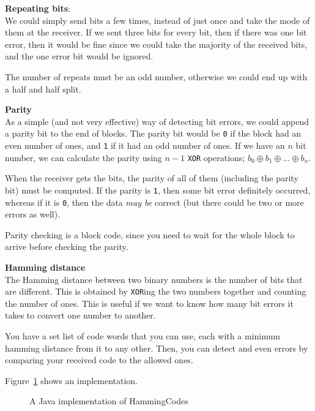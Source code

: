 \begin{description}
  \item \textbf{Repeating bits}:\\
    We could simply send bits a few times, instead of just once and take the 
    mode of them at the receiver. If we sent three bits for every bit, then
    if there was one bit error, then it would be fine since we could take the 
    majority of the received bits, and the one error bit would be ignored.

    The number of repeats must be an odd number, otherwise we could end up with 
    a half and half split.
  \item \textbf{Parity}\\
    As a simple (and not very effective) way of detecting bit errors, we could
    append a parity bit to the end of blocks. The parity bit would be \texttt{0}
    if the block had an even number of ones, and \texttt{1} if it had an odd
    number of ones. If we have an $n$ bit number, we can calculate the parity
    using $n - 1$ \texttt{XOR} operations; $b_0 \oplus b_1 \oplus \dots \oplus
    b_n$.

    When the receiver gets the bits, the parity of all of them (including the
    parity bit) must be computed. If the parity is \texttt{1}, then some bit
    error definitely occurred, whereas if it is \texttt{0}, then the data
    \textit{may be} correct (but there could be two or more errors as well).

    Parity checking is a block code, since you need to wait for the whole block
    to arrive before checking the parity.
  \item \textbf{Hamming distance}\\
    The Hamming distance between two binary numbers is the number of bits that
    are different. This is obtained by \texttt{XOR}ing the two numbers together
    and counting the number of ones. This is useful if we want to know how many
    bit errors it takes to convert one number to another.

    You have a set list of code words that you can use, each with a minimum
    hamming distance from it to any other. Then, you can detect and even errors
    by comparing your received code to the allowed ones.

    Figure~\ref{HammingCodes} shows an implementation.

    \begin{figure}
      
      \caption{A Java implementation of HammingCodes}
      \label{HammingCodes}
    \end{figure}


\end{description}
